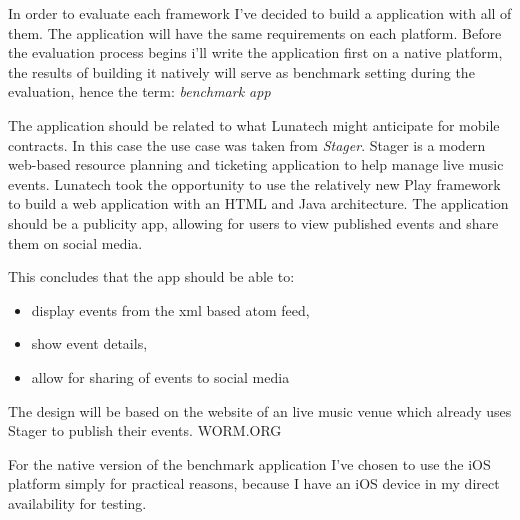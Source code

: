 In order to evaluate each framework I've decided to build a application with all of them. The application will have the same requirements on each platform. Before the evaluation process begins i'll write the application first on a native platform, the results of building it natively will serve as benchmark setting during the evaluation, hence the term: \emph{benchmark app}

The application should be related to what Lunatech might anticipate for mobile contracts. In this case the use case was taken from \emph{Stager}. Stager is a modern web-based resource planning and ticketing application to help manage live music events. Lunatech took the opportunity to use the relatively new Play framework to build a web application with an HTML and Java architecture. The application should be a publicity app, allowing for users to view published events and share them on social media.

This concludes that the app should be able to:
\begin{itemize}
	\item display events from the xml based atom feed,
	\item show event details,
	\item allow for sharing of events to social media
\end{itemize}
The design will be based on the website of an live music venue which already uses Stager to publish their events. WORM.ORG

For the native version of the benchmark application I've chosen to use the iOS platform simply for practical reasons, because I have an iOS device in my direct availability for testing.

